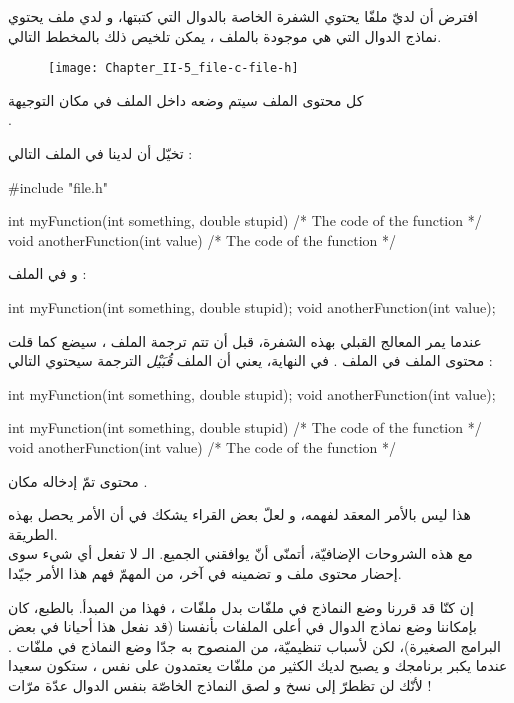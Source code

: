 افترض أن لديّ ملفّا
يحتوي الشفرة الخاصة بالدوال التي كتبتها، و لدي ملف
يحتوي نماذج الدوال التي هي موجودة بالملف
،
يمكن تلخيص ذلك بالمخطط التالي.

\begin{figure}[H]
	\centering
	\texttt{[image: Chapter\_II-5\_file-c-file-h]}
\end{figure}
كل محتوى الملف
سيتم وضعه داخل الملف
في مكان التوجيهة\\
.

تخيّل أن لدينا في الملف
التالي :

\begin{Csource}
#include "file.h"

int myFunction(int something, double stupid)
{
  /* The code of the function */
}
void anotherFunction(int value)
{
  /* The code of the function */
}
\end{Csource}

و في الملف
 :

\begin{Csource}
int myFunction(int something, double stupid);
void anotherFunction(int value);
\end{Csource}

عندما يمر المعالج القبلي بهذه الشفرة، قبل أن تتم ترجمة الملف
،
سيضع كما قلت محتوى الملف
 في الملف
.
في النهاية، يعني أن الملف
\textit{قُبَيْل}
الترجمة سيحتوي التالي :

\begin{Csource}
int myFunction(int something, double stupid);
void anotherFunction(int value);

int myFunction(int something, double stupid)
{
  /* The code of the function */
}
void anotherFunction(int value)
{
  /* The code of the function */
}
\end{Csource}

محتوى
تمّ إدخاله مكان
.

هذا ليس بالأمر المعقد لفهمه، و لعلّ بعض القراء يشكك في أن الأمر يحصل بهذه الطريقة.\\
مع هذه الشروحات الإضافيّة، أتمنّى أنّ يوافقني الجميع.
الـ
لا تفعل أي شيء سوى إحضار محتوى ملف و تضمينه في آخر، من المهمّ فهم هذا الأمر جيّدا.

\begin{information}
  إن كنّا قد قررنا وضع النماذج في ملفّات
بدل ملفّات
،
فهذا من المبدأ.
بالطبع، كان بإمكاننا وضع نماذج الدوال في أعلى الملفات
بأنفسنا (قد نفعل هذا أحيانا في بعض البرامج الصغيرة)، لكن لأسباب تنظيميّة، من المنصوح به جدّا وضع النماذج في ملفّات
.
 عندما يكبر برنامجك و يصبح لديك الكثير من ملفّات
يعتمدون على نفس
،
ستكون سعيدا لأنّك لن تظطرّ إلى نسخ و لصق النماذج الخاصّة بنفس الدوال عدّة مرّات !
\end{information}

